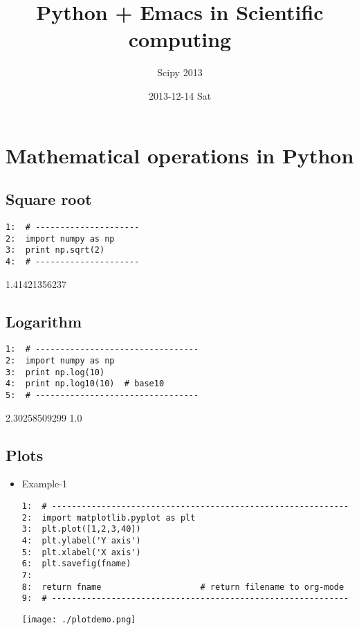 \documentclass[11pt]{article}
\title{Python + Emacs in Scientific computing}
\author{Scipy 2013}
\date{2013-12-14 Sat}
\begin{document}
\maketitle



\section{Mathematical operations in Python}
\label{sec-1}
\subsection{Square root}
\label{sec-1-1}



\begin{verbatim}
1:  # ---------------------
2:  import numpy as np
3:  print np.sqrt(2)
4:  # ---------------------
\end{verbatim}

     1.41421356237
\subsection{Logarithm}
\label{sec-1-2}



\begin{verbatim}
1:  # ---------------------------------
2:  import numpy as np
3:  print np.log(10)
4:  print np.log10(10)  # base10
5:  # ---------------------------------
\end{verbatim}

     2.30258509299
     1.0
\subsection{Plots}
\label{sec-1-3}


\begin{itemize}
\item Example-1
    

\begin{verbatim}
1:  # ------------------------------------------------------------
2:  import matplotlib.pyplot as plt
3:  plt.plot([1,2,3,40])
4:  plt.ylabel('Y axis')
5:  plt.xlabel('X axis')
6:  plt.savefig(fname)
7:  
8:  return fname                    # return filename to org-mode
9:  # ------------------------------------------------------------
\end{verbatim}

     \texttt{[image: ./plotdemo.png]}
\end{itemize}
\end{document}
